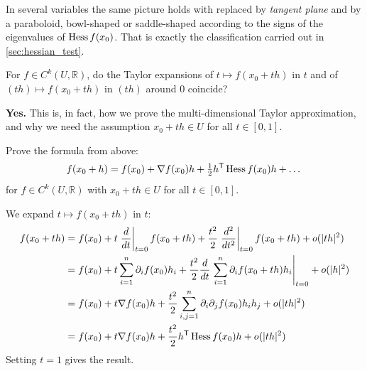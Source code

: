 In several variables the same picture holds with  replaced by \emph{tangent
plane} and  by a paraboloid, bowl-shaped or saddle-shaped according to the
signs of the eigenvalues of $\operatorname{Hess} f(x_0)$. That is exactly the classification carried out in
\cref{sec:hessian_test}.

\begin{question}
For $f \in C^k(U, \mathbb{R})$, do the Taylor expansions of $t \mapsto f(x_0+th)$ in $t$ and of
$(th) \mapsto f(x_0+th)$ in $(th)$ around $0$ coincide?
\end{question}

\begin{answer}
\textbf{Yes.} This is, in fact, how we prove the multi-dimensional Taylor approximation, and why
we need the assumption $x_0 + th \in U$ for all $t \in [0,1]$.
\end{answer}

\begin{exercise}
\label{ex:hessian_taylor_proof}
Prove the formula from above:
\[f(x_0+h) = f(x_0) + \nabla f(x_0)h + \tfrac{1}{2}h^{\mathsf{T}} \operatorname{Hess} f(x_0)h + \dots\]
for $f \in C^k(U,\mathbb{R})$ with $x_0 + th \in U$ for all $t \in [0,1]$.
\end{exercise}

\begin{exercisesolution}
We expand $t \mapsto f(x_0+th)$ in $t$:
\[
\begin{aligned}
f(x_0+th) &= f(x_0) + t\left.\frac{d}{dt}\right|_{t=0}f(x_0+th) + \frac{t^2}{2}\left.\frac{d^2}{dt^2}\right|_{t=0}f(x_0+th) + o(|th|^2) \\
&= f(x_0) + t\sum_{i=1}^{n}\partial_i f(x_0)h_i + \frac{t^2}{2}\frac{d}{dt}\left.\sum_{i=1}^{n}\partial_i f(x_0+th)h_i\right|_{t=0} + o(|h|^2) \\
&= f(x_0) + t\nabla f(x_0)h + \frac{t^2}{2}\sum_{i,j=1}^{n}\partial_i\partial_j f(x_0)h_ih_j + o(|th|^2) \\
&= f(x_0) + t\nabla f(x_0)h + \frac{t^2}{2}h^{\mathsf{T}} \operatorname{Hess} f(x_0)h + o(|th|^2)
\end{aligned}
\]
Setting $t = 1$ gives the result.
\end{exercisesolution}


